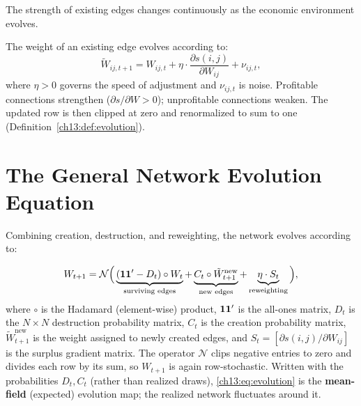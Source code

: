 \documentclass[../structural_economics_book.tex]{subfiles}
\begin{document}
The strength of existing edges changes continuously as the economic environment evolves.

\begin{definition}\label{ch13:def:reweighting}
The weight of an existing edge evolves according to:
\begin{equation}\label{ch13:eq:reweighting}
\tilde W_{ij,t+1} = W_{ij,t} + \eta \cdot \frac{\partial s(i,j)}{\partial W_{ij}} + \nu_{ij,t},
\end{equation}
where $\eta > 0$ governs the speed of adjustment and $\nu_{ij,t}$ is noise. Profitable connections strengthen ($\partial s / \partial W > 0$); unprofitable connections weaken. The updated row is then clipped at zero and renormalized to sum to one (Definition~\ref{ch13:def:evolution}).
\end{definition}


\section{The General Network Evolution Equation}
\label{ch13:sec:evolution}

Combining creation, destruction, and reweighting, the network evolves according to:

\begin{definition}\label{ch13:def:evolution}
\begin{equation}\label{ch13:eq:evolution}
W_{t+1} = \mathcal{N}\Big(\underbrace{(\mathbf{1}\mathbf{1}' - D_t) \circ W_t}_{\text{surviving edges}} + \underbrace{C_t \circ \tilde{W}^{\text{new}}_{t+1}}_{\text{new edges}} + \underbrace{\eta \cdot S_t}_{\text{reweighting}}\Big),
\end{equation}
where $\circ$ is the Hadamard (element-wise) product, $\mathbf{1}\mathbf{1}'$ is the all-ones matrix, $D_t$ is the $N \times N$ destruction probability matrix, $C_t$ is the creation probability matrix, $\tilde{W}^{\text{new}}_{t+1}$ is the weight assigned to newly created edges, and $S_t = [\partial s(i,j)/\partial W_{ij}]$ is the surplus gradient matrix. The operator $\mathcal{N}$ clips negative entries to zero and divides each row by its sum, so $W_{t+1}$ is again row-stochastic. Written with the probabilities $D_t, C_t$ (rather than realized draws), \eqref{ch13:eq:evolution} is the \textbf{mean-field} (expected) evolution map; the realized network fluctuates around it.
\end{definition}
\end{document}

